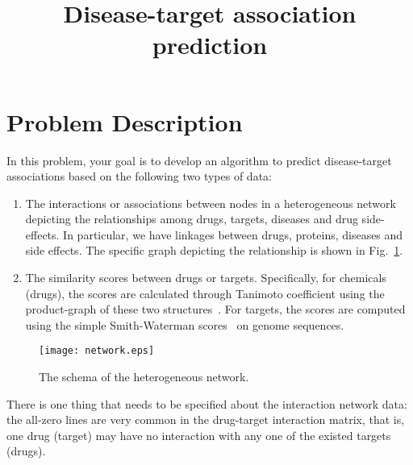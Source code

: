\documentclass[12pt]{article}
\title{Disease-target association prediction \\
}
\begin{document}
\date{}

\maketitle \vspace{-1cm}


\setlength{\baselineskip}{18pt plus 1pt minus 1pt}




\section{Problem Description}

In this problem, your goal is to develop an algorithm to predict
disease-target associations based on the following two types of data:

\begin{enumerate}
\item[(1)] The interactions or associations between nodes in a
heterogeneous network depicting the relationships among drugs,
targets, diseases and drug side-effects. In particular, we have
linkages between drugs, proteins, diseases and side effects. The
specific graph depicting the relationship is shown in
Fig.~\ref{fig:network}.

\item[(1)]  The similarity scores between drugs or targets.
 Specifically, for chemicals (drugs), the scores are calculated
through Tanimoto coefficient using the product-graph of these two
structures~\cite{hattori2003development}. For targets, the scores
are computed using the simple Smith-Waterman
scores~\cite{smith1981identification} on genome sequences.
\end{enumerate}


\begin{figure}[h]
\centering
\texttt{[image: network.eps]}
\caption{The schema of the heterogeneous
network.}\label{fig:network}
\end{figure}



There is one thing that needs to be specified  about the
interaction network data: the all-zero lines are very common in
the drug-target interaction matrix, that is, one drug (target) may
have no interaction with any one of the existed targets (drugs).

\end{document}
